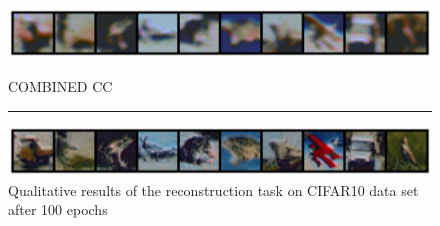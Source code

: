 \begin{figure}[h]
    \centerline{\hspace*{8mm}\includegraphics[width=1.4\textwidth]{figures/reconstruction_CIFAR10_RP_ReLU_CC_epoch_100.png}}
    \caption*{\normalsize{COMBINED CC}}
    \rule{0.4\textwidth}{.4pt}
    
    \centerline{\hspace*{8mm}\includegraphics[width=1.4\textwidth]{figures/reconstruction_CIFAR10_COMBINED_CC_epoch_100.png}}
    
    \caption{Qualitative results of the reconstruction task on CIFAR10 data set after 100 epochs}
    \label{fig:MNIST_Images}
\end{figure}






